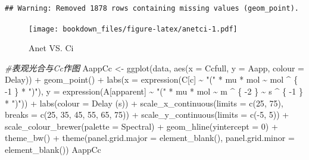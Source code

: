 \documentclass[
]{krantz}
\makeatletter
\newenvironment{Shaded}{\begin{snugshade}}{\end{snugshade}}
\newcommand{\AttributeTok}[1]{\textcolor[rgb]{0.77,0.63,0.00}{#1}}
\newcommand{\CommentTok}[1]{\textcolor[rgb]{0.56,0.35,0.01}{\textit{#1}}}
\newcommand{\DecValTok}[1]{\textcolor[rgb]{0.00,0.00,0.81}{#1}}
\newcommand{\FunctionTok}[1]{\textcolor[rgb]{0.00,0.00,0.00}{#1}}
\newcommand{\NormalTok}[1]{#1}
\newcommand{\OtherTok}[1]{\textcolor[rgb]{0.56,0.35,0.01}{#1}}
\newcommand{\SpecialCharTok}[1]{\textcolor[rgb]{0.00,0.00,0.00}{#1}}
\newcommand{\StringTok}[1]{\textcolor[rgb]{0.31,0.60,0.02}{#1}}
\newenvironment{kframe}{%
\medskip{}
\setlength{\fboxsep}{.8em}
 \def\at@end@of@kframe{}%
 \ifinner\ifhmode%
  \def\at@end@of@kframe{\end{minipage}}%
  \begin{minipage}{\columnwidth}%
 \fi\fi%
 \def\FrameCommand##1{\hskip\@totalleftmargin \hskip-\fboxsep
 \colorbox{shadecolor}{##1}\hskip-\fboxsep
     \hskip-\linewidth \hskip-\@totalleftmargin \hskip\columnwidth}%
 \MakeFramed {\advance\hsize-\width
   \@totalleftmargin\z@ \linewidth\hsize
   \@setminipage}}%
 {\par\unskip\endMakeFramed%
 \at@end@of@kframe}
\renewenvironment{Shaded}{\begin{kframe}}{\end{kframe}}
\makeatother
\begin{document}
\begin{verbatim}
## Warning: Removed 1878 rows containing missing values (geom_point).
\end{verbatim}

\begin{figure}
\centering
\texttt{[image: bookdown\_files/figure-latex/anetci-1.pdf]}
\caption{\label{fig:anetci}Anet VS. Ci}
\end{figure}

\begin{Shaded}
\begin{Highlighting}[]
\CommentTok{\#表观光合与Cc作图}
\NormalTok{AappCc }\OtherTok{\textless{}{-}} \FunctionTok{ggplot}\NormalTok{(data, }\FunctionTok{aes}\NormalTok{(}\AttributeTok{x =}\NormalTok{ Ccfull, }\AttributeTok{y =}\NormalTok{ Aapp, }\AttributeTok{colour =}\NormalTok{ Delay)) }\SpecialCharTok{+}
  \FunctionTok{geom\_point}\NormalTok{() }\SpecialCharTok{+}
  \FunctionTok{labs}\NormalTok{(}\AttributeTok{x =} \FunctionTok{expression}\NormalTok{(C[c] }\SpecialCharTok{\textasciitilde{}} \StringTok{"("} \SpecialCharTok{*}\NormalTok{ mu }\SpecialCharTok{*}\NormalTok{ mol }\SpecialCharTok{\textasciitilde{}}\NormalTok{ mol }\SpecialCharTok{\^{}}\NormalTok{ \{}
    \SpecialCharTok{{-}}\DecValTok{1}
\NormalTok{  \} }\SpecialCharTok{*} \StringTok{")"}\NormalTok{),}
  \AttributeTok{y =} \FunctionTok{expression}\NormalTok{(A[apparent] }\SpecialCharTok{\textasciitilde{}} \StringTok{"("} \SpecialCharTok{*}\NormalTok{ mu }\SpecialCharTok{*}\NormalTok{ mol }\SpecialCharTok{\textasciitilde{}}\NormalTok{ m }\SpecialCharTok{\^{}}\NormalTok{ \{}
    \SpecialCharTok{{-}}\DecValTok{2}
\NormalTok{  \} }\SpecialCharTok{\textasciitilde{}}\NormalTok{ s }\SpecialCharTok{\^{}}\NormalTok{ \{}
    \SpecialCharTok{{-}}\DecValTok{1}
\NormalTok{  \} }\SpecialCharTok{*} \StringTok{")"}\NormalTok{)) }\SpecialCharTok{+}
  \FunctionTok{labs}\NormalTok{(}\AttributeTok{colour =} \StringTok{\textquotesingle{}Delay (s)\textquotesingle{}}\NormalTok{) }\SpecialCharTok{+}
  \FunctionTok{scale\_x\_continuous}\NormalTok{(}\AttributeTok{limits =} \FunctionTok{c}\NormalTok{(}\DecValTok{25}\NormalTok{, }\DecValTok{75}\NormalTok{),}
                     \AttributeTok{breaks =} \FunctionTok{c}\NormalTok{(}\DecValTok{25}\NormalTok{, }\DecValTok{35}\NormalTok{, }\DecValTok{45}\NormalTok{, }\DecValTok{55}\NormalTok{, }\DecValTok{65}\NormalTok{, }\DecValTok{75}\NormalTok{)) }\SpecialCharTok{+}
  \FunctionTok{scale\_y\_continuous}\NormalTok{(}\AttributeTok{limits =} \FunctionTok{c}\NormalTok{(}\SpecialCharTok{{-}}\DecValTok{5}\NormalTok{, }\DecValTok{5}\NormalTok{)) }\SpecialCharTok{+}
  \FunctionTok{scale\_colour\_brewer}\NormalTok{(}\AttributeTok{palette =} \StringTok{\textquotesingle{}Spectral\textquotesingle{}}\NormalTok{) }\SpecialCharTok{+}
  \FunctionTok{geom\_hline}\NormalTok{(}\AttributeTok{yintercept =} \DecValTok{0}\NormalTok{) }\SpecialCharTok{+}
  \FunctionTok{theme\_bw}\NormalTok{() }\SpecialCharTok{+}
  \FunctionTok{theme}\NormalTok{(}\AttributeTok{panel.grid.major =} \FunctionTok{element\_blank}\NormalTok{(),}
        \AttributeTok{panel.grid.minor =} \FunctionTok{element\_blank}\NormalTok{())}
\NormalTok{AappCc}
\end{Highlighting}
\end{Shaded}
\end{document}
